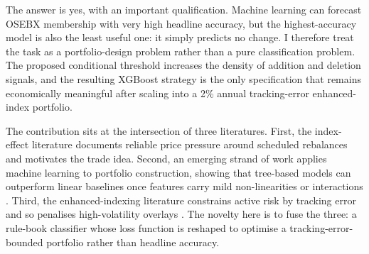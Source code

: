 The answer is yes, with an important qualification. Machine learning can forecast OSEBX membership with very high headline accuracy, but the highest-accuracy model is also the least useful one: it simply predicts no change. I therefore treat the task as a portfolio-design problem rather than a pure classification problem. The proposed conditional threshold increases the density of addition and deletion signals, and the resulting XGBoost strategy is the only specification that remains economically meaningful after scaling into a 2\% annual tracking-error enhanced-index portfolio.

The contribution sits at the intersection of three literatures. First, the index-effect literature documents reliable price pressure around scheduled rebalances and motivates the trade idea. Second, an emerging strand of work applies machine learning to portfolio construction, showing that tree-based models can outperform linear baselines once features carry mild non-linearities or interactions \parencite{rouf-stock-market-prediction-using-machine-learning,goodell-artificial-intelligence-and-machine-learning-in-finance}. Third, the enhanced-indexing literature constrains active risk by tracking error and so penalises high-volatility overlays \parencite{ahmed-performance-of-enhanced-index-and-quantitative-equity-funds,nbim-from-passive-to-enhanced}. The novelty here is to fuse the three: a rule-book classifier whose loss function is reshaped to optimise a tracking-error-bounded portfolio rather than headline accuracy.
